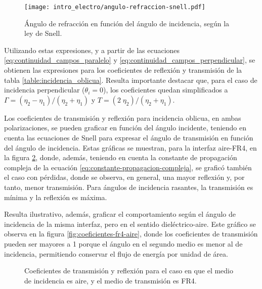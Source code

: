 \begin{figure}[htp]
	\centering
	\texttt{[image: intro\_electro/angulo-refraccion-snell.pdf]}
	\caption{Ángulo de refracción en función del ángulo de incidencia, según la ley de Snell.}
	\label{fig:ley_snell}
\end{figure}

Utilizando estas expresiones, y a partir de las ecuaciones \ref{eq:continuidad_campos_paralelo} y \ref{eq:continuidad_campos_perpendicular}, se obtienen las expresiones para los coeficientes de reflexión y transmisión de la tabla \ref{table:incidencia_oblicua}. Resulta importante destacar que, para el caso de incidencia perpendicular ($\theta_i = 0$), los coeficientes quedan simplificados a $\Gamma = (\eta_2 - \eta_1)/(\eta_2 + \eta_1)$ y $T = (2 \; \eta_2)/(\eta_2 + \eta_1)$.

Los coeficientes de transmisión y reflexión para incidencia oblicua, en ambas polarizaciones, se pueden graficar en función del ángulo incidente, teniendo en cuenta las ecuaciones de Snell para expresar el ángulo de transmisión en función del ángulo de incidencia. Estas gráficas se muestran, para la interfaz aire-FR4, en la figura \ref{fig:coeficientes-aire-fr4}, donde, además,  teniendo en cuenta la constante de propagación compleja de la ecuación \ref{eq:constante-propagacion-compleja}, se graficó también el caso con pérdidas, donde se observa, en general, una mayor reflexión y, por tanto, menor transmisión. Para ángulos de incidencia rasantes, la transmisión es mínima y la reflexión es máxima.

Resulta ilustrativo, además, graficar el comportamiento según el ángulo de incidencia de la misma interfaz, pero en el sentido dieléctrico-aire. Este gráfico se observa en la figura \ref{fig:coeficientes-fr4-aire}, donde los coeficientes de transmisión pueden ser mayores a 1 porque el ángulo en el segundo medio es menor al de incidencia, permitiendo conservar el flujo de energía por unidad de área.

\begin{figure}[H]
	\centering 
	\caption{Coeficientes de transmisión y reflexión para el caso en que el medio de incidencia es aire, y el medio de transmisión es FR4.}
	\label{fig:coeficientes-aire-fr4}
\end{figure}


